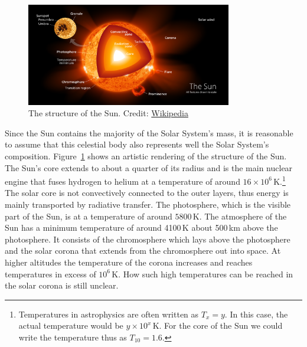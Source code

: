 \begin{figure}[tb]
    \centering
    \includegraphics[width=0.8\textwidth]{graphics/solar_system_abundances/sun_structure}
    \caption{The structure of the Sun. Credit: \href{https://en.wikipedia.org/wiki/Sun}{Wikipedia}}
    \label{fig:Sun_structure}
\end{figure}
Since the Sun contains the majority of the Solar System's mass, it is reasonable to assume that this celestial body also represents well the Solar System's composition. Figure~\ref{fig:Sun_structure} shows an artistic rendering of the structure of the Sun. The Sun's core extends to about a quarter of its radius and is the main nuclear engine that fuses hydrogen to helium at a temperature of around $16\times10^{6}$\,K.\footnote{Temperatures in astrophysics are often written as $T_x = y$. In this case, the actual temperature would be $y\times10^{x}$\,K. For the core of the Sun we could write the temperature thus as $T_{10} = 1.6$.} The solar core is not convectively connected to the outer layers, thus energy is mainly transported by radiative transfer. The photosphere, which is the visible part of the Sun, is at a temperature of around $5800$\,K. The atmosphere of the Sun has a minimum temperature of around 4100\,K about 500\,km above the photosphere. It consists of the chromosphere which lays above the photosphere and the solar corona that extends from the chromosphere out into space. At higher altitudes the temperature of the corona increases and reaches temperatures in excess of $10^6$\,K. How such high temperatures can be reached in the solar corona is still unclear.



